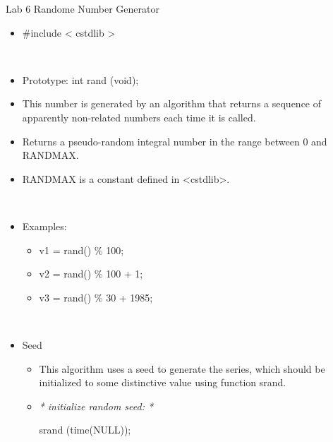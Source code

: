 \documentclass[presentation]{beamer}
\begin{document}
\begin{frame}[label=sec-6]{Lab 6 Randome Number Generator}
\begin{itemize}
\item \#include < \alert{cstdlib} >
\end{itemize}
\\
\begin{itemize}
\item Prototype: \alert{int rand (void);}
\item This number is generated by an algorithm that returns a sequence of apparently non-related numbers each time it is called.
\item Returns a pseudo-random integral number in the range between 0 and RAND\textunderscore MAX.
\item RAND\textunderscore MAX is a constant defined in <cstdlib>.
\end{itemize}
\\
\begin{itemize}
\item Examples:
\begin{itemize}
\item v1 = rand() \% 100;
\item v2 = rand() \% 100 + 1;
\item v3 = rand() \% 30 + 1985;
\end{itemize}
\end{itemize}
\\ 
\begin{itemize}
\item Seed
\begin{itemize}
\item This algorithm uses a seed to generate the series, which should be initialized to some distinctive value using function srand.
\item \emph{* initialize random seed: *}

\alert{srand (time(NULL));}
\end{itemize}
\end{itemize}
\end{frame}
\end{document}
